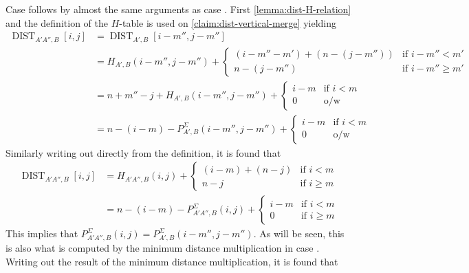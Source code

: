 \documentclass[twoside,11pt,openright]{report}
\newcommand{\DIST}{\operatorname{DIST}}
\newcommand*{\circled}[1]{\tikz[baseline=(char.base)]{
                          \node[shape=circle,draw,inner sep=2pt] (char) {#1};}}
\begin{document}
Case \circled{2} follows by almost the same arguments as case \circled{1}. First \cref{lemma:dist-H-relation} and the definition of the $H$-table is used on \cref{claim:dist-vertical-merge} yielding
\begin{align*}
  \DIST_{A'A'',B}[i, j] &= \DIST_{A',B}[i - m'', j - m''] \\
    &= H_{A',B}(i - m'', j - m'') +
      \begin{cases}
        (i - m'' - m') + (n - (j - m'')) & \text{if } i - m'' < m' \\
        n - (j - m'')                    & \text{if } i - m'' \geq m'
      \end{cases} \\
    &= n + m'' - j + H_{A',B}(i - m'', j - m'') +
      \begin{cases}
        i - m   & \text{if } i < m \\
        0       & \text{o/w}
      \end{cases} \\
    &= n - (i - m) - P_{A',B}^{\Sigma}(i - m'', j - m'') +
      \begin{cases}
        i - m   & \text{if } i < m \\
        0       & \text{o/w}
      \end{cases}
\end{align*}
Similarly writing out directly from the definition, it is found that
\begin{align*}
  \DIST_{A'A'',B}[i, j] &= H_{A'A'',B}(i, j) +
    \begin{cases}
      (i - m) + (n - j) & \text{if } i < m \\
      n - j             & \text{if } i \geq m
    \end{cases} \\
  &= n - (i - m) - P_{A'A'',B}^{\Sigma}(i, j) +
    \begin{cases}
      i - m & \text{if } i < m \\
      0     & \text{if } i \geq m
    \end{cases}
\end{align*}
This implies that $P_{A'A'',B}^{\Sigma}(i, j) = P_{A',B}^{\Sigma}(i - m'', j - m'')$. As will be seen, this is also what is computed by the minimum distance multiplication in case \circled{3}. Writing out the result of the minimum distance multiplication, it is found that
\end{document}

